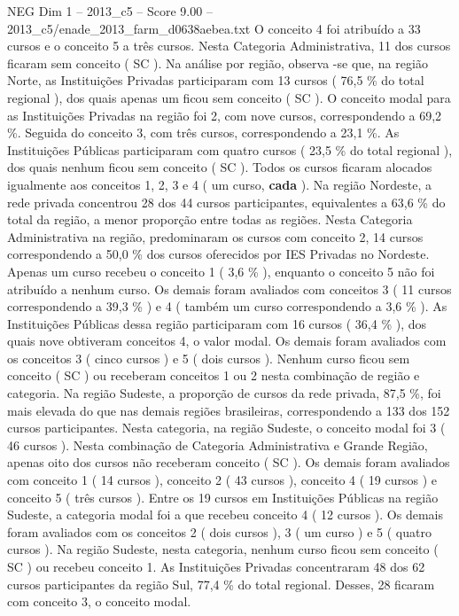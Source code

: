 \begin{textsample}{NEG Dim 1 – 2013\_c5 – Score 9.00 – 2013\_c5/enade\_2013\_farm\_d0638aebea.txt}
O conceito 4 foi atribuído a 33 cursos e o conceito 5 a três cursos.
Nesta Categoria Administrativa, 11 dos cursos ficaram sem conceito ( SC ).
Na análise por região, observa -se que, na região Norte, as Instituições Privadas participaram com 13 cursos ( 76,5 \% do total regional ), dos quais apenas um ficou sem conceito ( SC ).
O conceito modal para as Instituições Privadas na região foi 2, com nove cursos, correspondendo a 69,2 \%.
Seguida do conceito 3, com três cursos, correspondendo a 23,1 \%.
As Instituições Públicas participaram com quatro cursos ( 23,5 \% do total regional ), dos quais nenhum ficou sem conceito ( SC ).
Todos os cursos ficaram alocados igualmente aos conceitos 1, 2, 3 e 4 ( um curso, \textbf{cada} ).
Na região Nordeste, a rede privada concentrou 28 dos 44 cursos participantes, equivalentes a 63,6 \% do total da região, a menor proporção entre todas as regiões.
Nesta Categoria Administrativa na região, predominaram os cursos com conceito 2, 14 cursos correspondendo a 50,0 \% dos cursos oferecidos por IES Privadas no Nordeste.
Apenas um curso recebeu o conceito 1 ( 3,6 \% ), enquanto o conceito 5 não foi atribuído a nenhum curso.
Os demais foram avaliados com conceitos 3 ( 11 cursos correspondendo a 39,3 \% ) e 4 ( também um curso correspondendo a 3,6 \% ).
As Instituições Públicas dessa região participaram com 16 cursos ( 36,4 \% ), dos quais nove obtiveram conceitos 4, o valor modal.
Os demais foram avaliados com os conceitos 3 ( cinco cursos ) e 5 ( dois cursos ).
Nenhum curso ficou sem conceito ( SC ) ou receberam conceitos 1 ou 2 nesta combinação de região e categoria.
Na região Sudeste, a proporção de cursos da rede privada, 87,5 \%, foi mais elevada do que nas demais regiões brasileiras, correspondendo a 133 dos 152 cursos participantes.
Nesta categoria, na região Sudeste, o conceito modal foi 3 ( 46 cursos ).
Nesta combinação de Categoria Administrativa e Grande Região, apenas oito dos cursos não receberam conceito ( SC ).
Os demais foram avaliados com conceito 1 ( 14 cursos ), conceito 2 ( 43 cursos ), conceito 4 ( 19 cursos ) e conceito 5 ( três cursos ).
Entre os 19 cursos em Instituições Públicas na região Sudeste, a categoria modal foi a que recebeu conceito 4 ( 12 cursos ).
Os demais foram avaliados com os conceitos 2 ( dois cursos ), 3 ( um curso ) e 5 ( quatro cursos ).
Na região Sudeste, nesta categoria, nenhum curso ficou sem conceito ( SC ) ou recebeu conceito 1.
As Instituições Privadas concentraram 48 dos 62 cursos participantes da região Sul, 77,4 \% do total regional.
Desses, 28 ficaram com conceito 3, o conceito modal.

\end{textsample}
